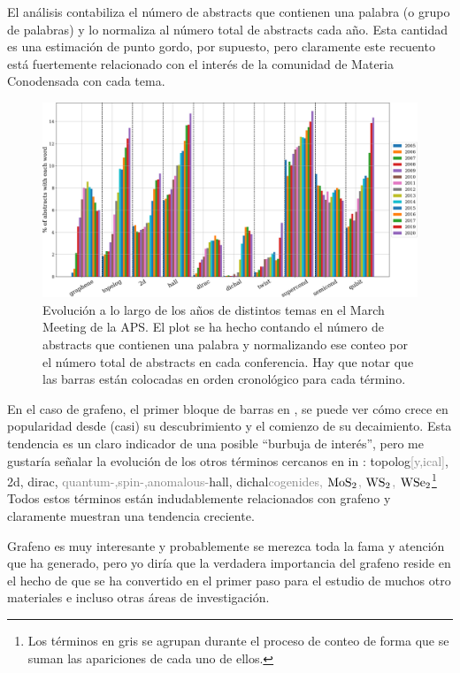 El análisis contabiliza el número de abstracts que contienen una palabra (o grupo de palabras) y lo normaliza al número total de abstracts cada año.
Esta cantidad es una estimación de punto gordo, por supuesto, pero claramente este recuento está fuertemente relacionado con el interés de la comunidad de Materia Conodensada con cada tema.

\begin{figure}[!ht]
\centering
\includegraphics{introduction/figures/topics.png}
\vspace{-20pt}
\caption{Evolución a lo largo de los años de distintos temas en el March Meeting de la APS. El plot se ha hecho contando el número de abstracts que contienen una palabra y normalizando ese conteo por el número total de abstracts en cada conferencia. Hay que notar que las barras están colocadas en orden cronológico para cada término.}
\label{topics}
\end{figure}
En el caso de grafeno, el primer bloque de barras en , se puede ver cómo crece en popularidad desde (casi) su descubrimiento y el comienzo de su decaimiento. Esta tendencia es un claro indicador de una posible ``burbuja de interés'', pero me gustaría señalar la evolución de los otros términos cercanos en in : topolog\textcolor{gray}{[y,ical]}, 2d, dirac, \textcolor{gray}{quantum-,spin-,anomalous-}hall, dichal\textcolor{gray}{cogenides, $\ce{MoS2}$, $\ce{WS2}$, $\ce{WSe2}$}\footnote{Los términos en gris se agrupan durante el proceso de conteo de forma que se suman las apariciones de cada uno de ellos.}
Todos estos términos están indudablemente relacionados con grafeno y claramente muestran una tendencia creciente.
\medskip

Grafeno es muy interesante y probablemente se merezca toda la fama y atención que ha generado, pero yo diría que la verdadera importancia del grafeno reside en el hecho de que se ha convertido en el primer paso para el estudio de muchos otro materiales e incluso otras áreas de investigación.

